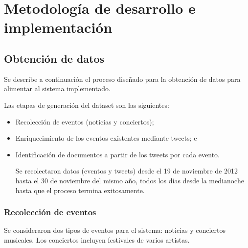 \section{Metodología de desarrollo e implementación}
\label{sec-1.2}



\subsection{Obtención de datos}
\label{sec-1.2.1}

    Se describe a continuación el proceso diseñado para la obtención de
    datos para alimentar al sistema implementado.

    Las etapas de generación del dataset son las siguientes:

\begin{itemize}
\item Recolección de eventos (noticias y conciertos);
\item Enriquecimiento de los eventos existentes mediante tweets; e
\item Identificación de documentos a partir de los tweets por cada evento.

      Se recolectaron datos (eventos y tweets) desde el 19 de noviembre de
      2012 hasta el 30 de noviembre del mismo año, todos los días
      desde la medianoche hasta que el proceso termina exitosamente.
\end{itemize}
\subsubsection{Recolección de eventos}

Se consideraron dos tipos de eventos para el sistema: noticias y
conciertos musicales. Los conciertos incluyen festivales de varios
artistas.

